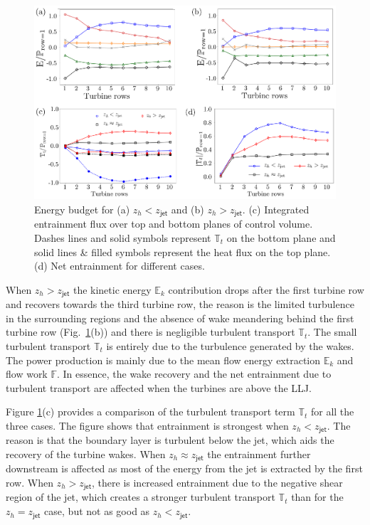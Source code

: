\documentclass[%
 aip,
 amsmath,amssymb,
preprint,%
author-numerical,%
]{revtex4-1}
\begin{document}
\begin{figure}[ht!]
 \centering
 \includegraphics[width=0.9\linewidth]{energy_budget_jrse}
 \vspace{-0.75cm}
 \caption{Energy budget for (a) $z_h < z_\mathsf{jet}$ and (b) $z_h > z_\mathsf{jet}$. (c) Integrated entrainment flux over top and bottom planes of control volume. Dashes lines and solid symbols represent $\mathbb{T}_t$ on the bottom plane and solid lines \& filled symbols represent the heat flux on the top plane. (d) Net entrainment for different cases.}
 \label{energybudget}
\end{figure}

When $z_h > z_\mathsf{jet}$ the kinetic energy $\mathbb{E}_k$ contribution drops after the first turbine row and recovers towards the third turbine row, the reason is the limited turbulence in the surrounding regions and the absence of wake meandering behind the first turbine row (Fig.\ \ref{energybudget}(b)) and there is negligible turbulent transport $\mathbb{T}_t$. The small turbulent transport $\mathbb{T}_t$ is entirely due to the turbulence generated by the wakes. The power production is mainly due to the mean flow energy extraction $\mathbb{E}_k$ and flow work $\mathbb{F}$. In essence, the wake recovery and the net entrainment due to turbulent transport are affected when the turbines are above the LLJ.

Figure \ref{energybudget}(c) provides a comparison of the turbulent transport term $\mathbb{T}_t$ for all the three cases. The figure shows that entrainment is strongest when $z_h < z_\mathsf{jet}$. The reason is that the boundary layer is turbulent below the jet, which aids the recovery of the turbine wakes. When $z_h \approx z_\mathsf{jet}$ the entrainment further downstream is affected as most of the energy from the jet is extracted by the first row. When $z_h > z_\mathsf{jet}$, there is increased entrainment due to the negative shear region of the jet, which creates a stronger turbulent transport $\mathbb{T}_t$ than for the $z_h=z_\mathsf{jet}$ case, but not as good as $z_h < z_\mathsf{jet}$.
\end{document}
